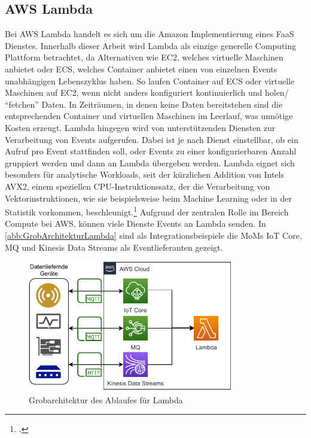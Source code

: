 \subsection{AWS Lambda}





Bei \ac{AWS} Lambda handelt es sich um die Amazon Implementierung eines \ac{FaaS} Dienstes. Innerhalb dieser Arbeit wird Lambda als einzige generelle Computing Plattform betrachtet, da Alternativen wie \ac{EC2}, welches virtuelle Maschinen anbietet oder \ac{ECS}, welches Container anbietet einen von einzelnen Events unabhängigen Lebenszyklus haben. So laufen Container auf \ac{ECS} oder virtuelle Maschinen auf \ac{EC2}, wenn nicht anders konfiguriert kontinuierlich und holen/ \enquote{fetchen} Daten. In Zeiträumen, in denen keine Daten bereitstehen sind die entsprechenden Container und virtuellen Maschinen im Leerlauf, was unnötige Kosten erzeugt. Lambda hingegen wird von unterstützenden Diensten zur Verarbeitung von Events aufgerufen. Dabei ist je nach Dienst einstellbar, ob ein Aufruf pro Event stattfinden soll, oder Events zu einer konfigurierbaren Anzahl gruppiert werden und dann an Lambda übergeben werden. Lambda eignet sich besonders für analytische Workloads, seit der kürzlichen Addition von Intels \ac{AVX2}, einem speziellen CPU-Instruktionssatz, der die Verarbeitung von Vektorinstruktionen, wie sie beispielsweise beim Machine Learning oder in der Statistik vorkommen, beschleunigt.\footcite[Vgl.][]{Beswick.24.11.2020} Aufgrund der zentralen Rolle im Bereich Compute bei \ac{AWS}, können viele Dienste Events an Lambda senden. In \autoref{abb:GrobArchitekturLambda} sind als Integrationsbeispiele die \acp{MoM} \ac{IoT} Core, MQ und Kinesis Data Streams als Eventlieferanten gezeigt.
\begin{figure}[H]
\centering
\includegraphics[width=0.8\textwidth]{graphics/Lambda-general.pdf}
\caption{Grobarchitektur des Ablaufes für Lambda}
\label{abb:GrobArchitekturLambda}
\end{figure}

